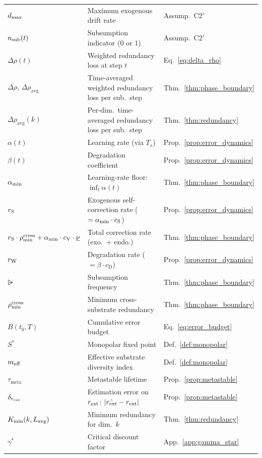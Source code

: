 \begin{table}[h]
\begin{tabular}{@{}lll@{}}
$d_{\mathrm{max}}$ & Maximum exogenous drift rate & Assump.\ C2$'$ \\
$n_{\mathrm{sub}}(t)$ & Subsumption indicator ($0$ or $1$) & Assump.\ C2$'$ \\
$\Delta\rho(t)$ & Weighted redundancy loss at step $t$ & Eq.\ \ref{eq:delta_rho} \\
$\overline{\Delta\rho}$, $\Delta\rho_{\mathrm{avg}}$ & Time-averaged weighted redundancy loss per sub.\ step & Thm.\ \ref{thm:phase_boundary} \\
$\Delta\rho_{\mathrm{avg}}(k)$ & Per-dim.\ time-averaged redundancy loss per sub.\ step & Thm.\ \ref{thm:redundancy} \\
$\alpha(t)$ & Learning rate (via $T_s$) & Prop.\ \ref{prop:error_dynamics} \\
$\beta(t)$ & Degradation coefficient & Prop.\ \ref{prop:error_dynamics} \\
$\alpha_{\min}$ & Learning-rate floor: $\inf_t \alpha(t)$ & Thm.\ \ref{thm:phase_boundary} \\
$r_{\mathrm{S}}$ & Exogenous self-correction rate ($= \alpha_{\min} \cdot c_{\mathrm{S}}$) & Prop.\ \ref{prop:error_dynamics} \\
$r_{\mathrm{S}} \cdot \rho_{\min}^{\mathrm{cross}} + \alpha_{\min} \cdot c_{\mathrm{V}} \cdot \underline{\nu}$ & Total correction rate (exo.\ + endo.) & Thm.\ \ref{thm:phase_boundary} \\
$r_{\mathrm{W}}$ & Degradation rate ($= \beta \cdot c_{\mathrm{D}}$) & Prop.\ \ref{prop:error_dynamics} \\
$\rsub$ & Subsumption frequency & Thm.\ \ref{thm:phase_boundary} \\
$\rho_{\min}^{\mathrm{cross}}$ & Minimum cross-substrate redundancy & Thm.\ \ref{thm:phase_boundary} \\
$B(t_0, T)$ & Cumulative error budget & Eq.\ \ref{eq:error_budget} \\
$S^*$ & Monopolar fixed point & Def.\ \ref{def:monopolar} \\
$m_{\mathrm{eff}}$ & Effective substrate diversity index & Def.\ \ref{def:monopolar} \\
$\tau_{\mathrm{meta}}$ & Metastable lifetime & Prop.\ \ref{prop:metastable} \\
$\delta_{r_{\mathrm{ext}}}$ & Estimation error on $r_{\mathrm{ext}}$: $|\hat{r_{\mathrm{ext}}} - r_{\mathrm{ext}}|$ & Prop.\ \ref{prop:metastable} \\
$K_{\mathrm{min}}(k, L_{\mathrm{avg}})$ & Minimum redundancy for dim.\ $k$ & Thm.\ \ref{thm:redundancy} \\
$\gamma^*$ & Critical discount factor~\citep[Prop.\ 6]{lasser2026horizon} & App.\ \ref{app:gamma_star} \\

\end{tabular}
\end{table}
